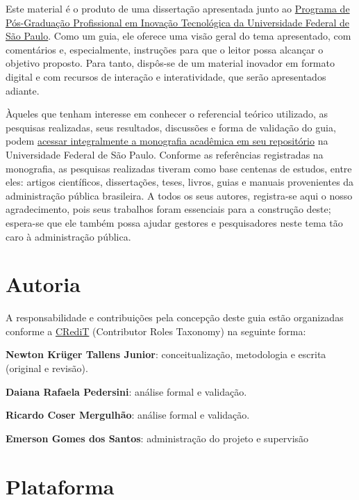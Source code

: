 \documentclass[
  letterpaper,
  DIV=11,
  numbers=noendperiod]{scrreprt}
\begin{document}

Este material é o produto de uma dissertação apresentada junto ao
\href{https://www.unifesp.br/campus/sjc/ppgit}{Programa de Pós-Graduação
Profissional em Inovação Tecnológica da Universidade Federal de São
Paulo}. Como um guia, ele oferece uma visão geral do tema apresentado,
com comentários e, especialmente, instruções para que o leitor possa
alcançar o objetivo proposto. Para tanto, dispôs-se de um material
inovador em formato digital e com recursos de interação e
interatividade, que serão apresentados adiante.

Àqueles que tenham interesse em conhecer o referencial teórico
utilizado, as pesquisas realizadas, seus resultados, discussões e forma
de validação do guia, podem
\href{https://repositorio.unifesp.br/handle/11600/61097}{acessar
integralmente a monografia acadêmica em seu repositório} na Universidade
Federal de São Paulo. Conforme as referências registradas na monografia,
as pesquisas realizadas tiveram como base centenas de estudos, entre
eles: artigos científicos, dissertações, teses, livros, guias e manuais
provenientes da administração pública brasileira. A todos os seus
autores, registra-se aqui o nosso agradecimento, pois seus trabalhos
foram essenciais para a construção deste; espera-se que ele também possa
ajudar gestores e pesquisadores neste tema tão caro à administração
pública.

\hypertarget{autoria}{%
\section*{Autoria}\label{autoria}}


A responsabilidade e contribuições pela concepção deste guia estão
organizadas conforme a \href{https://credit.niso.org/}{CRediT}
(Contributor Roles Taxonomy) na seguinte forma:

\textbf{Newton Krüger Tallens Junior}: conceitualização, metodologia e
escrita (original e revisão).

\textbf{Daiana Rafaela Pedersini}: análise formal e validação.

\textbf{Ricardo Coser Mergulhão}: análise formal e validação.

\textbf{Emerson Gomes dos Santos}: administração do projeto e supervisão

\hypertarget{plataforma}{%
\section*{Plataforma}\label{plataforma}}
\end{document}
